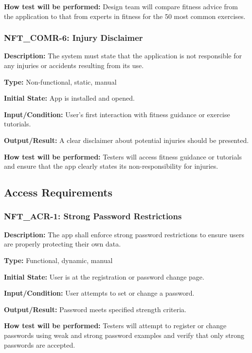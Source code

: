 \documentclass[12pt, titlepage]{article}
\begin{document}
\textbf{How test will be performed:} Design team will compare fitness advice from the application to that from experts in fitness for the 50 most common exercises. 


\subsubsection*{\textbf{NFT\_COMR-6: Injury Disclaimer}
}

\textbf{Description: }The system must state that the application is not responsible for any injuries or accidents resulting from its use.

\textbf{Type: }Non-functional, static, manual

\textbf{Initial State: }App is installed and opened.

\textbf{Input/Condition:} User's first interaction with fitness guidance or exercise tutorials.

\textbf{Output/Result:} A clear disclaimer about potential injuries should be presented.

\textbf{How test will be performed:} Testers will access fitness guidance or tutorials and ensure that the app clearly states its non-responsibility for injuries.
\newline
\subsection{Access Requirements}


\subsubsection*{\textbf{NFT\_ACR-1: Strong Password Restrictions}
}

\textbf{Description: }The app shall enforce strong password restrictions to ensure users are properly protecting their own data.

\textbf{Type:} Functional, dynamic, manual

\textbf{Initial State:} User is at the registration or password change page.

\textbf{Input/Condition:} User attempts to set or change a password.

\textbf{Output/Result:} Password meets specified strength criteria.

\textbf{How test will be performed:} Testers will attempt to register or change passwords using weak and strong password examples and verify that only strong passwords are accepted.
\end{document}
